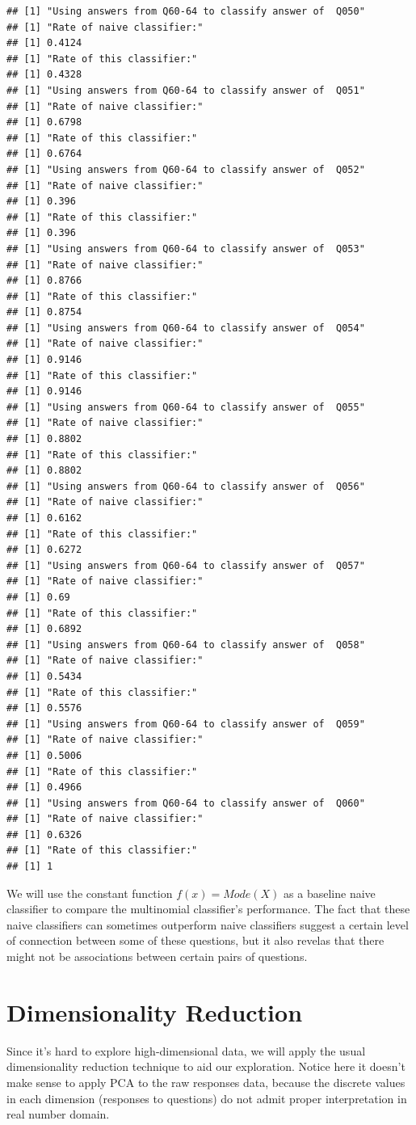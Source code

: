 \documentclass[]{article}
\begin{document}
\begin{verbatim}
## [1] "Using answers from Q60-64 to classify answer of  Q050"
## [1] "Rate of naive classifier:"
## [1] 0.4124
## [1] "Rate of this classifier:"
## [1] 0.4328
## [1] "Using answers from Q60-64 to classify answer of  Q051"
## [1] "Rate of naive classifier:"
## [1] 0.6798
## [1] "Rate of this classifier:"
## [1] 0.6764
## [1] "Using answers from Q60-64 to classify answer of  Q052"
## [1] "Rate of naive classifier:"
## [1] 0.396
## [1] "Rate of this classifier:"
## [1] 0.396
## [1] "Using answers from Q60-64 to classify answer of  Q053"
## [1] "Rate of naive classifier:"
## [1] 0.8766
## [1] "Rate of this classifier:"
## [1] 0.8754
## [1] "Using answers from Q60-64 to classify answer of  Q054"
## [1] "Rate of naive classifier:"
## [1] 0.9146
## [1] "Rate of this classifier:"
## [1] 0.9146
## [1] "Using answers from Q60-64 to classify answer of  Q055"
## [1] "Rate of naive classifier:"
## [1] 0.8802
## [1] "Rate of this classifier:"
## [1] 0.8802
## [1] "Using answers from Q60-64 to classify answer of  Q056"
## [1] "Rate of naive classifier:"
## [1] 0.6162
## [1] "Rate of this classifier:"
## [1] 0.6272
## [1] "Using answers from Q60-64 to classify answer of  Q057"
## [1] "Rate of naive classifier:"
## [1] 0.69
## [1] "Rate of this classifier:"
## [1] 0.6892
## [1] "Using answers from Q60-64 to classify answer of  Q058"
## [1] "Rate of naive classifier:"
## [1] 0.5434
## [1] "Rate of this classifier:"
## [1] 0.5576
## [1] "Using answers from Q60-64 to classify answer of  Q059"
## [1] "Rate of naive classifier:"
## [1] 0.5006
## [1] "Rate of this classifier:"
## [1] 0.4966
## [1] "Using answers from Q60-64 to classify answer of  Q060"
## [1] "Rate of naive classifier:"
## [1] 0.6326
## [1] "Rate of this classifier:"
## [1] 1
\end{verbatim}

We will use the constant function $f(x) = Mode(X)$ as a baseline naive
classifier to compare the multinomial classifier's performance. The fact
that these naive classifiers can sometimes outperform naive classifiers
suggest a certain level of connection between some of these questions,
but it also revelas that there might not be associations between certain
pairs of questions.

\section{Dimensionality Reduction}\label{dimensionality-reduction}

Since it's hard to explore high-dimensional data, we will apply the
usual dimensionality reduction technique to aid our exploration. Notice
here it doesn't make sense to apply PCA to the raw responses data,
because the discrete values in each dimension (responses to questions)
do not admit proper interpretation in real number domain.
\end{document}
